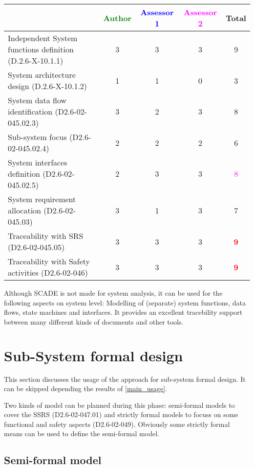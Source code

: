 \begin{tabular}{|l | c | c | c | c|}
\hline
& \textcolor{green}{Author} & \textcolor{blue}{Assessor 1} & \textcolor{magenta}{Assessor 2} & Total \\
\hline
Independent System functions definition (D.2.6-X-10.1.1)  &
3& 3     &3 &  9 \\
\hline 
System architecture design (D.2.6-X-10.1.2) & 1     & 1     &
0& 3      \\
\hline
System data flow identification (D2.6-02-045.02.3)  &
3& 2     &3 &  8 \\
\hline
Sub-system focus (D2.6-02-045.02.4)  &  2& 2     &2 &  6 \\
\hline
System interfaces definition (D2.6-02-045.02.5)  &
2& 3     &3 & \textcolor{magenta}{8}  \\
\hline
System requirement allocation (D2.6-02-045.03)  &  3&
1 &3 &  7 \\
\hline
Traceability with SRS (D2.6-02-045.05)  &  3& 3     &3 & \textcolor{red}{\textbf{9}}  \\
\hline
Traceability with Safety activities (D2.6-02-046)  &
3 & 3     &3 & \textcolor{red}{\textbf{9}}  \\
\hline
\end{tabular}

\begin{author_comment}
Although SCADE is not made for system analysis, it can be used for the following aspects on system level: Modelling of (separate) system functions, data flows, state machines and interfaces. It provides an excellent tracebility support between many different kinds of documents and other tools.  
\end{author_comment}


\section{Sub-System formal design}
This section discusses the usage of the approach for sub-system formal design.
It can be skipped depending the results of \ref{main_usage}.

Two kinds of model can be planned during this phase: semi-formal models to  cover the SSRS (D2.6-02-047.01) and strictly formal  models to  focuss on some functional and safety aspects (D2.6-02-049).  Obviously some strictly  formal means can be used to define the semi-formal  model.

\subsection{Semi-formal model}

